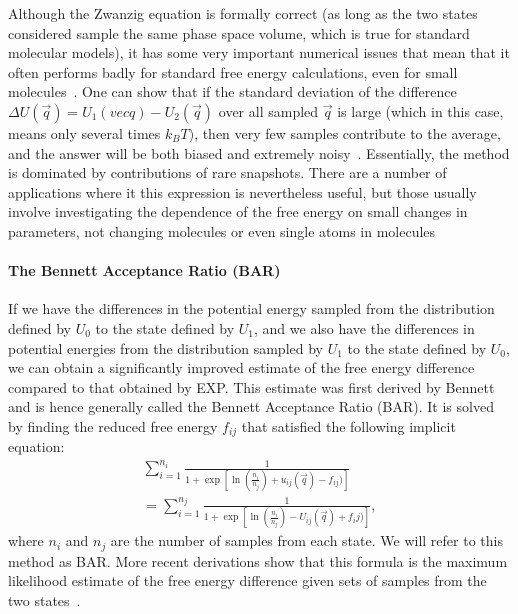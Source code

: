 \documentclass[9pt,bestpractices]{livecoms}
\begin{document}
%
Although the Zwanzig equation is formally correct (as long as the two states considered sample the same phase space volume, which is true for standard molecular models), it has some very important numerical issues that mean that it often performs badly for standard free energy calculations, even for small molecules~\cite{shirts2005comparison,lu2003appropriate}.  One can show that if the standard deviation of the difference $\Delta U(\vec{q}) = U_1(vec{q})-U_2(\vec{q})$ over all sampled $\vec{q}$ is large (which in this case, means only several times $k_BT)$, then very few samples contribute to the average, and the answer will be both biased and extremely noisy~\cite{lelievre2010free}. Essentially, the method is dominated by contributions of rare snapshots\cite{jarzynski2006rare, wu2005phasespaceb, wu2005phasespacec}. There are a number of applications where it this expression is nevertheless useful, but those usually involve investigating the dependence of the free energy on small changes in parameters, not changing molecules or even single atoms in molecules~\cite{xx}
%
\paragraph{The Bennett Acceptance Ratio (BAR)}
%
If we have the differences in the potential energy sampled from the distribution defined by $U_0$ to the state defined by $U_1$, and we also have the differences in potential energies from the distribution sampled by $U_1$ to the state defined by $U_0$, we can obtain a significantly improved estimate of the
free energy difference compared to that obtained by EXP. 
This estimate was first derived by Bennett and is hence generally called the Bennett Acceptance Ratio (BAR).  It is solved by finding the reduced free energy $f_{ij}$ that satisfied the following implicit equation:
\begin{eqnarray}
 \sum_{i=1}^{n_i} \frac{1}{1 + \exp[\ln(\frac{n_i}{n_j}) + u_{ij}(\vec{q}) - f_{ij})
 ]} \nonumber \\
 =\sum_{i=1}^{n_j} \frac{1}{1 + \exp[\ln(\frac{n_i}{n_j}) - U_{ij}(\vec{q}) + f_ij)]},
\end{eqnarray}
where $n_i$ and $n_j$ are the number of samples from each state. We
will refer to this method as BAR. More recent derivations show that this formula is the maximum likelihood estimate of the free energy difference given sets of samples from the two states~\cite{bennett1976efficient,shirts2003equilibriuma}. 
\end{document}
